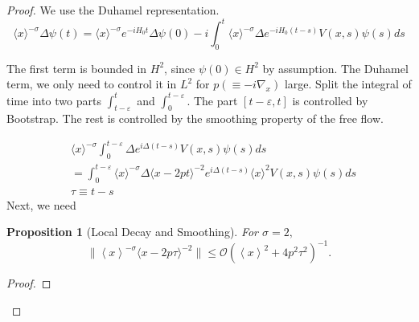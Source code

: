 \documentclass[11pt]{article}
\newtheorem{proposition}[theorem]{Proposition}
\begin{document}
\begin{proof}
We use the Duhamel representation.
$$
\langle x\rangle^{-\sigma} \Delta \psi(t)=\langle x\rangle^{-\sigma} e^{-i H_{0} t} \Delta \psi(0)-i \int_{0}^{t}\langle x\rangle^{-\sigma} \Delta e^{-i H_{0}(t-s)} V\left(x, s\right) \psi(s) d s
$$

The first term is bounded in $H^{2}$, since $\psi(0) \in H^{2}$ by assumption.
The Duhamel term, we only need to control it in $L^{2}$ for $p\left(\equiv-i \nabla_{x}\right)$ large.
Split the integral of time into two parts $\int_{t-\varepsilon}^{t}$ and $\int_{0}^{t-\varepsilon}$.
The part $[t- \varepsilon, t]$ is controlled by Bootstrap. The rest is controlled by the smoothing property of the free flow.

\begin{equation}\label{Duhamel}
\begin{aligned}
& \langle x\rangle^{-\sigma} \int_{0}^{t-\varepsilon} \Delta e^{i \Delta(t-s)} V(x, s) \psi(s) d s \\
& =\int_{0}^{t-\varepsilon}\langle x\rangle^{-\sigma} \Delta\langle x-2 p t\rangle^{-2} e^{i \Delta(t-s)}\langle x\rangle^{2} V(x, s) \psi(s) d s \\
& \tau \equiv t-s
\end{aligned}
\end{equation}
 Next, we need
\begin{proposition}[Local Decay and Smoothing]

For $\sigma =2,$
\begin{equation}\label{LD1}
\|\left < x\right >^{-\sigma} \langle x-2 p \tau\rangle^{-2}\| \leq \mathcal{O}( \left < x\right >^2+4p^2\tau^2)^{-1}.
\end{equation}
\end{proposition}
\begin{proof}


\end{proof}
\end{proof}
\end{document}
